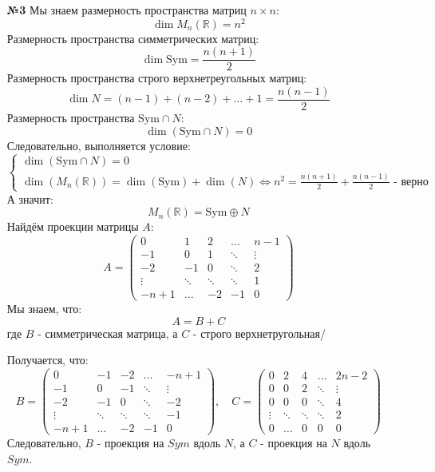 \documentclass[a4paper]{article}
\newcommand{\mat}[1]{\begin{pmatrix} #1 \end{pmatrix}}
\renewcommand{\f}[2]{\frac{#1}{#2}}
\newcommand{\case}[1]{\begin{cases} #1 \end{cases}}
\newcommand{\lr}{\Leftrightarrow}
\newcommand{\RR}{\mathbb{R}}
\begin{document}
\begin{enumerate}
    \item[\textbf{№3}] Мы знаем размерность пространства матриц $n \times n$:
    $$\dim{M_n(\RR)} = n^2$$
    Размерность пространства симметрических матриц:
    $$\dim \text{Sym} = \f{n(n+1)}{2}$$
    Размерность пространства строго верхнетреугольных матриц:
    $$\dim N = (n-1) + (n-2) + \dots + 1 = \f{n(n-1)}{2}$$
    Размерность пространства $\text{Sym} \cap N$:
    $$\dim (\text{Sym} \cap N) = 0$$
    Следовательно, выполняется условие:
    $$\case{
        \dim (\text{Sym} \cap N) = 0\\
        \dim(M_n(\RR)) = \dim(\text{Sym}) + \dim(N) \lr n^2 = \f{n(n+1)}{2}+\f{n(n-1)}{2} \text{ - верно}
    }$$
    А значит:
    $$M_n(\RR) = \text{Sym} \oplus N$$
    Найдём проекции матрицы $A$:
    $$A = \mat{0 & 1 & 2 & \ldots & n-1 \\
     -1 & 0 & 1 & \ddots & \vdots \\ 
     -2 & -1 & 0 & \ddots & 2 \\
      \vdots & \ddots & \ddots & \ddots & 1 \\ 
      -n+1 & \ldots & -2 & -1 & 0}$$
    Мы знаем, что:
    $$A = B + C$$ где $B$ - симметрическая матрица, а $C$ - строго верхнетругольная/

    Получается, что:
    $$B = \mat{0 & -1 & -2 & \ldots & -n+1 \\
    -1 & 0 & -1 & \ddots & \vdots \\ 
    -2 & -1 & 0 & \ddots & -2 \\
     \vdots & \ddots & \ddots & \ddots & -1 \\ 
     -n+1 & \ldots & -2 & -1 & 0}, \quad C = \mat{
        0 & 2 & 4 & \ldots & 2n-2 \\
        0 & 0 & 2 & \ddots & \vdots \\ 
        0 & 0 & 0 & \ddots & 4 \\
        \vdots & \ddots & \ddots & \ddots & 2 \\ 
        0 & \ldots & 0 & 0 & 0}$$
    Следовательно, $B$ - проекция на $Sym$ вдоль $N$, а $C$ - проекция на $N$ вдоль $Sym$.


\end{enumerate}
\end{document}
